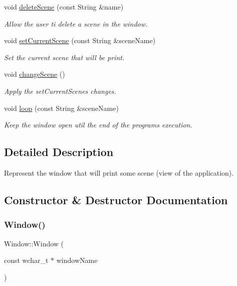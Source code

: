 \begin{DoxyCompactItemize}
void \hyperlink{classWindow_ad3a1ead02eca314e2df94e3e932fb5ae}{delete\+Scene} (const String \&name)
\begin{DoxyCompactList}\small\item\em Allow the user ti delete a scene in the window. \end{DoxyCompactList}\item 
void \hyperlink{classWindow_a3342dc02339a5974d5c6fcefd91d0cbf}{set\+Current\+Scene} (const String \&scene\+Name)
\begin{DoxyCompactList}\small\item\em Set the current scene that will be print. \end{DoxyCompactList}\item 
void \hyperlink{classWindow_af1b2a635ce47d9e841445b8b866a3b28}{change\+Scene} ()
\begin{DoxyCompactList}\small\item\em Apply the set\+Current\+Scene\textquotesingle{}s changes. \end{DoxyCompactList}\item 
void \hyperlink{classWindow_a9c9f1fd6ebc2b93f16ca870487a4a4c6}{loop} (const String \&scene\+Name)
\begin{DoxyCompactList}\small\item\em Keep the window open util the end of the program\textquotesingle{}s execution. \end{DoxyCompactList}\end{DoxyCompactItemize}


\subsection{Detailed Description}
Represent the window that will print some scene (view of the application). 

\subsection{Constructor \& Destructor Documentation}
\mbox{\label{classWindow_a25fd6af55e81b781b132166f77daf77e}} 
\subsubsection{\texorpdfstring{Window()}{Window()}}
{\footnotesize\ttfamily Window\+::\+Window (\begin{DoxyParamCaption}\item[{const wchar\+\_\+t $\ast$}]{window\+Name }\end{DoxyParamCaption})}



